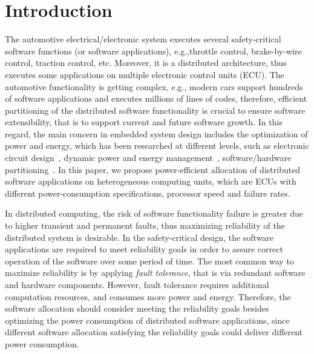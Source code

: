 \section{Introduction}
The automotive electrical/electronic system executes several safety-critical software functions (or software applications), e.g.,throttle control, brake-by-wire control, traction control, etc. Moreover, it is a distributed architecture, thus executes some applications on multiple electronic control units (ECU). The automotive functionality is getting complex, e.g., modern cars support hundreds of software applications and executes millions of lines of codes, therefore, efficient partitioning of the distributed software functionality is crucial to ensure software extensibility, that is to support current and future software growth. In this regard, the main concern in embedded system design includes the optimization of power and energy, which has been researched at different levels, such as electronic circuit design~\cite{Devadas1995ACircuits,Moyer2001Low-powerProcessors}, dynamic power and energy management~\cite{wang2015dynamic}, software/hardware partitioning~\cite{Dave1997COSYN,Goraczko2008Energy-optimalSystems,Wu2008AlgorithmicPartitioning}. In this paper, we propose power-efficient allocation of distributed software applications on heterogeneous computing units, which are ECUs with different power-consumption specifications, processor speed and failure rates.

In distributed computing, the risk of software functionality failure is greater due to higher transient and permanent faults, thus maximizing reliability of the distributed system is desirable. In the safety-critical design, the software applications are required to meet reliability goals in order to assure correct operation of the software over some period of time. The most common way to maximize reliability is by applying \textit{fault tolerance}, that is via redundant software and hardware components. However, fault tolerance requires additional computation resources, and consumes more power and energy. Therefore, the software allocation should consider meeting the reliability goals besides optimizing the power consumption of distributed software applications, since different software allocation satisfying the reliability goals could deliver different power consumption.

